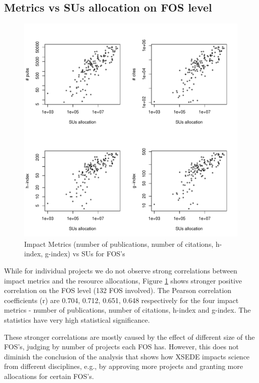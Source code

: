 \documentclass{sig-alternate}
\begin{document}
\subsection{Metrics vs SUs allocation on FOS level} 
 
\begin{figure}[!htb] 
  \centering 
    \includegraphics[width=1.0\columnwidth]{images/03_metrics_vs_alloc_fos.pdf} 
  \caption{Impact Metrics (number of publications, number of citations, h-index, g-index) vs SUs for FOS's}\label{F:metrics-vs-alloc-fos} 
\end{figure} 

While for individual projects we do not observe strong correlations between impact metrics and the resource allocations, Figure \ref {F:metrics-vs-alloc-fos} shows stronger positive correlation on the FOS level (132 FOS involved). The Pearson correlation coefficients (r) are 0.704, 0.712, 0.651, 0.648 respectively for the four impact metrics - number of publications, number of citations, h-index and g-index. The statistics have very high statistical significance.

These stronger correlations are mostly caused by the effect of different size of the FOS's, judging by number of projects each FOS has. However, this does not diminish the conclusion of the analysis that shows how XSEDE impacts science from different disciplines, e.g., by approving more projects and granting more allocations for certain FOS's.
 
\end{document}
